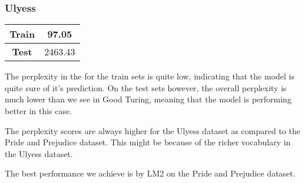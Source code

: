 \documentclass[a4paper,9pt]{report}
\begin{document}
\subsubsection*{Ulyess}
\begin{table}[H]
    \centering
    \begin{tabular}{|c|c|}
        \hline
        \textbf{Train} & {97.05} \\
        \hline
        \textbf{Test} & {2463.43} \\
        \hline
    \end{tabular}
\end{table}

The perplexity in the for the train sets is quite low, indicating that the model is quite sure of it's prediction. 
On the test sets however, the overall perplexity is much lower than we see in Good Turing, meaning that the model is performing better in this case.

The perplexity scores are always higher for the Ulyess dataset as compared to the Pride and Prejudice dataset. This might be because of the richer vocabulary in the Ulyess dataset.

The best performance we achieve is by LM2 on the Pride and Prejudice dataset.
\end{document}
